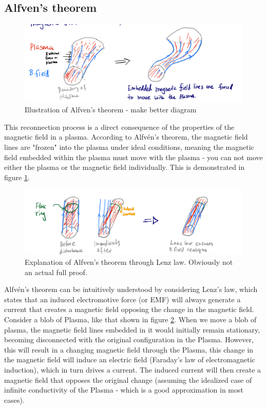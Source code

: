 \subsection{Alfven's theorem}

\begin{figure}
    \centering
    \includegraphics[width=\textwidth]{Chapter_2/Figs ch2/Alfven thm illustration 1.png}
    \caption{Illustration of Alfven's theorem - make better diagram}
    \label{fig:Alfven theorem}
\end{figure}

This reconnection process is a direct consequence of the properties of the magnetic field in a plasma. According to Alfvén's theorem, the magnetic field lines are "frozen" into the plasma under ideal conditions, meaning the magnetic field embedded within the plasma must move with the plasma - you can not move either the plasma or the magnetic field individually. This is demonstrated in figure \ref{fig:Alfven theorem}.

\begin{figure}
    \centering
    \includegraphics{Chapter_2/Figs ch2/Alfven theorem explanation 1.png}
    \caption{Explanation of Alfven's theorem through Lenz law. Obviously not an actual full proof.}
    \label{fig:Alfven through Lenz law}
\end{figure}

Alfvén's theorem can be intuitively understood by considering Lenz's law, which states that an induced electromotive force (or EMF) will always generate a current that creates a magnetic field opposing the change in the magnetic field. Consider a blob of Plasma, like that shown in figure \ref{fig:Alfven through Lenz law}. When we move a blob of plasma, the magnetic field lines embedded in it would initially remain stationary, becoming disconnected with the original configuration in the Plasma. However, this will result in a changing magnetic field through the Plasma, this change in the magnetic field will induce an electric field (Faraday's law of electromagnetic induction), which in turn drives a current. The induced current will then create a magnetic field that opposes the original change (assuming the idealized case of infinite conductivity of the Plasma - which is a good approximation in most cases).

